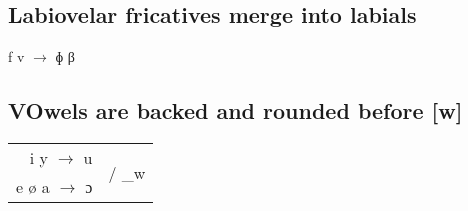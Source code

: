 \documentclass[a4paper,11pt,article,oneside]{memoir}
\newcommand{\bripa}[1]{[#1]}
\newcommand{\bilaf}{ɸ}
\newcommand{\bilav}{β}
\newcommand{\opno}{ɔ}
\begin{document}
\subsection{Labiovelar fricatives merge into labials}

\begin{center}
    f v $\to$ \bilaf{} \bilav{}
\end{center}

\subsection{VOwels are backed and rounded before \bripa{w}}

\begin{center}
    \begin{tabular}{rl}
    i y $\to$ u &
    \multirow{2}{*}{/ \_w}\\[0.1cm]
    e ø a $\to$ \opno{}
    \end{tabular}
\end{center}
\end{document}
